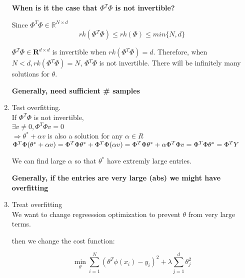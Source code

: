 \documentclass[12pt]{article}
\newcommand{\Rb}{\mathbf{R}}
\begin{document}
\begin{multicols}{2}
\begin{enumerate}
            \textbf{When is it the case that $\Phi^T\Phi$ is not invertible?}
            
            Since $\Phi^T \Phi \in \mathbb{R}^{N\times d}$ 
            $$rk(\Phi^T \Phi) \le rk(\Phi) \le min\{N,d\}$$

            $\Phi^T \Phi \in \Rb^{d \times d}$ is invertible when $rk(\Phi^T \Phi) = d$. Therefore, when $N < d, rk(\Phi^T \Phi) = N$, $\Phi^T \Phi $ is not invertible. There will be infinitely many solutions for $\theta$.

            \textbf{Generally, need sufficient \# samples}

            \item Test overfitting.\\
            If $\Phi^T \Phi$ is not invertible,\\
            $\exists v \ne 0 , \Phi^T \Phi v = 0$\\
            $\Rightarrow \theta^* + \alpha v$ is also a solution for any $\alpha \in R$\\
            $\Phi^T \Phi (\theta^* + \alpha v) = \Phi^T \Phi \theta^* + \Phi^T \Phi (\alpha v) \\ = \Phi^T \Phi \theta^* + \alpha \Phi^T \Phi v \\ = \Phi^T \Phi \theta^* = \Phi^T Y$

            We can find large $\alpha$ so that $\theta^*$ have extremly large entries.

            \textbf{Generally, if the entries are very large (abs) we might have overfitting}

            \item Treat overfitting\\
            We want to change regreession optimization to prevent $\theta$ from very large terms.

            then we change the cost function:

            $$\min_{\theta} \sum_{i = 1}^{N}(\theta^T\phi(x_i) - y_i)^2 + \lambda \sum_{j = 1}^d \theta_j^2$$


\end{enumerate}
\end{multicols}
\end{document}
